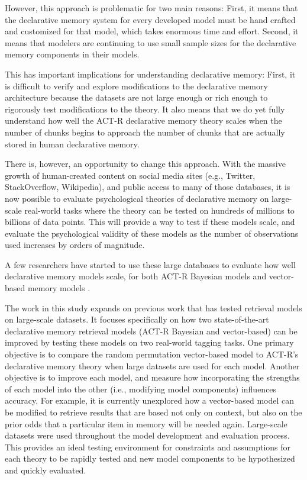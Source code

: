\documentclass[man,floatsintext,donotrepeattitle]{apa6}
\begin{document}
However, this approach is problematic for two main reasons:
First, it means that the declarative memory system for every developed model must be hand crafted and customized for that model, which takes enormous time and effort.
Second, it means that modelers are continuing to use small sample sizes for the declarative memory components in their models.

This has important implications for understanding declarative memory:
First, it is difficult to verify and explore modifications to the declarative memory architecture because the datasets are not large enough or rich enough to rigorously test modifications to the theory.
It also means that we do yet fully understand how well the ACT-R declarative memory theory scales when the number of chunks begins to approach the number of chunks that are actually stored in human declarative memory.

There is, however, an opportunity to change this approach.
With the massive growth of human-created content on social media sites (e.g., Twitter, StackOverflow, Wikipedia), and public access to many of those databases,
it is now possible to evaluate psychological theories of declarative memory on large-scale real-world tasks where the theory can be tested on hundreds of millions to billions of data points.
This will provide a way to test if these models scale, and evaluate the psychological validity of these models as the number of observations used increases by orders of magnitude.

A few researchers have started to use these large databases to evaluate how well declarative memory models scale,
for both ACT-R Bayesian models \parencites{Fu2007,Pirolli2003,Stanley2013,Douglass2010} and vector-based memory models \parencites{Jones2007,Rutledge2008,Recchia2010,Sahlgren2008}.

The work in this study expands on previous work that has tested retrieval models on large-scale datasets.
It focuses specifically on how two state-of-the-art declarative memory retrieval models (ACT-R Bayesian and vector-based) can be improved by testing these models on two real-world tagging tasks.
One primary objective is to compare the random permutation vector-based model to ACT-R's declarative memory theory when large datasets are used for each model. 
Another objective is to improve each model, and measure how incorporating the strengths of each model into the other (i.e., modifying model components) influences accuracy.
For example, it is currently unexplored how a vector-based model can be modified to retrieve results that are based not only on context, but also on the prior odds that a particular item in memory will be needed again.
Large-scale datasets were used throughout the model development and evaluation process.
This provides an ideal testing environment for constraints and assumptions for each theory to be rapidly tested and new model components to be hypothesized and quickly evaluated.
\end{document}
